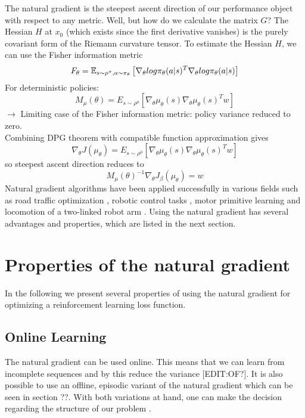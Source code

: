 The natural gradient is the steepest ascent direction of our performance object with respect to any metric. Well, but how do we calculate the matrix $G$? The Hessian $H$ at $x_0$ (which exists since the first derivative vanishes) is the purely covariant form of the Riemann curvature tensor. To estimate the Hessian $H$, we can use the Fisher information metric 
\begin{equation}
	F_\theta=\operatorname{\mathbb{E}}_{s\sim\rho^{\pi},a\sim\pi_{\theta}}\left[\nabla_{\theta}log\pi_{\theta}(a|s)^{T}\nabla_{\theta}log\pi_{\theta}(a|s)\right]
\end{equation}
For deterministic policies: 
\begin{equation}
	M_{\mu}(\theta)=E_{s\sim\rho^{\mu}}[\nabla_{\theta}\mu_{\theta}(s)\nabla_{\theta}\mu_{\theta}(s)^{T}w]
\end{equation}
$\rightarrow$ Limiting case of the Fisher information metric: policy variance reduced to zero.\\
Combining DPG theorem with compatible function approximation gives 
\begin{equation}
\nabla_{\theta}J(\mu_{\theta}) = E_{s\sim\rho^{\mu}}[\nabla_{\theta} \mu_{\theta}(s) \nabla_{\theta} \mu_{\theta}(s)^{T}w]
\end{equation} 
so steepest ascent direction reduces to
\begin{equation}
M_{\mu}(\theta)^{-1}\nabla_{\theta}J_{\beta}(\mu_{\theta})=w
\end{equation} 
Natural gradient algorithms have been applied successfully in various fields such as road traffic optimization \cite{richter2007natural}, robotic control tasks \cite{kim2010impedance}, motor primitive learning \cite{peters2007applying} and locomotion of a two-linked robot arm \cite{park2005rls}. Using the natural gradient has several advantages and properties, which are listed in the next section.
\section{Properties of the natural gradient}
In the following we present several properties of using the natural gradient for optimizing a reinforcement learning loss function.
\subsection{Online Learning}
The natural gradient can be used online. This means that we can learn from incomplete sequences and by this reduce the variance [EDIT:OF?]. It is also possible to use an offline, episodic variant of the natural gradient which can be seen in section ??. With both variations at hand, one can make the decision regarding the structure of our problem \cite{pascanu2013revisiting, peters2008natural}.

